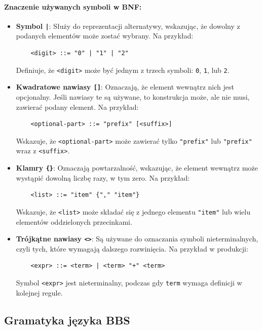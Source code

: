 \paragraph{Znaczenie używanych symboli w BNF:}
\begin{itemize}
    \item \textbf{Symbol \texttt{|}}: Służy do reprezentacji alternatywy, wskazując, że dowolny z podanych elementów może zostać wybrany. Na przykład:
    \begin{verbatim}
    <digit> ::= "0" | "1" | "2"
    \end{verbatim}
    Definiuje, że \texttt{<digit>} może być jednym z trzech symboli: \texttt{0}, \texttt{1}, lub \texttt{2}.
    
    \item \textbf{Kwadratowe nawiasy \texttt{[]}}: Oznaczają, że element wewnątrz nich jest opcjonalny. Jeśli nawiasy te są używane, to konstrukcja może, ale nie musi, zawierać podany element. Na przykład:
    \begin{verbatim}
    <optional-part> ::= "prefix" [<suffix>]
    \end{verbatim}
    Wskazuje, że \texttt{<optional-part>} może zawierać tylko \texttt{"prefix"} lub \texttt{"prefix"} wraz z \texttt{<suffix>}.
    
    \item \textbf{Klamry \texttt{\{\}}}: Oznaczają powtarzalność, wskazując, że element wewnątrz może wystąpić dowolną liczbę razy, w tym zero. Na przykład:
    \begin{verbatim}
    <list> ::= "item" {"," "item"}
    \end{verbatim}
    Wskazuje, że \texttt{<list>} może składać się z jednego elementu \texttt{"item"} lub wielu elementów oddzielonych przecinkami.
    
    \item \textbf{Trójkątne nawiasy \texttt{<>}}: Są używane do oznaczania symboli nieterminalnych, czyli tych, które wymagają dalszego rozwinięcia. Na przykład w produkcji:
    \begin{verbatim}
    <expr> ::= <term> | <term> "+" <term>
    \end{verbatim}
    Symbol \texttt{<expr>} jest nieterminalny, podczas gdy \texttt{term} wymaga definicji w kolejnej regule.
\end{itemize}

\subsection{Gramatyka języka BBS}

